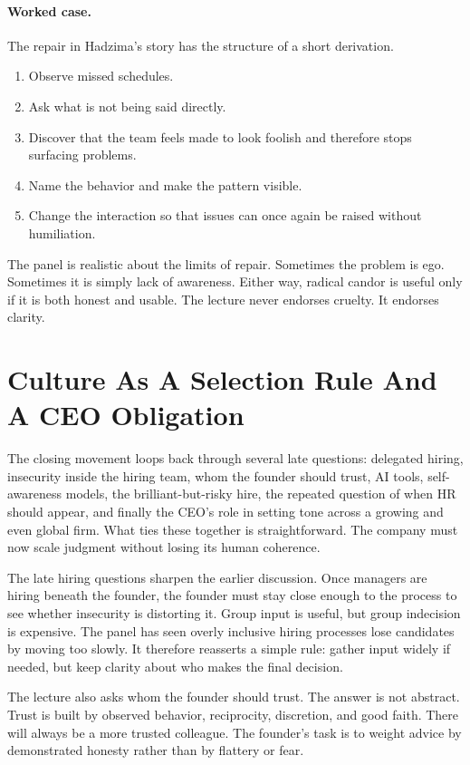 \paragraph{Worked case.} The repair in Hadzima's story has the structure of a short derivation.

\begin{enumerate}
\item Observe missed schedules.
\item Ask what is not being said directly.
\item Discover that the team feels made to look foolish and therefore stops surfacing problems.
\item Name the behavior and make the pattern visible.
\item Change the interaction so that issues can once again be raised without humiliation.
\end{enumerate}

The panel is realistic about the limits of repair. Sometimes the problem is ego. Sometimes it is simply lack of awareness. Either way, radical candor is useful only if it is both honest and usable. The lecture never endorses cruelty. It endorses clarity.

\section{Culture As A Selection Rule And A CEO Obligation}

The closing movement loops back through several late questions: delegated hiring, insecurity inside the hiring team, whom the founder should trust, AI tools, self-awareness models, the brilliant-but-risky hire, the repeated question of when HR should appear, and finally the CEO's role in setting tone across a growing and even global firm. What ties these together is straightforward. The company must now scale judgment without losing its human coherence.

The late hiring questions sharpen the earlier discussion. Once managers are hiring beneath the founder, the founder must stay close enough to the process to see whether insecurity is distorting it. Group input is useful, but group indecision is expensive. The panel has seen overly inclusive hiring processes lose candidates by moving too slowly. It therefore reasserts a simple rule: gather input widely if needed, but keep clarity about who makes the final decision.

The lecture also asks whom the founder should trust. The answer is not abstract. Trust is built by observed behavior, reciprocity, discretion, and good faith. There will always be a more trusted colleague. The founder's task is to weight advice by demonstrated honesty rather than by flattery or fear.

